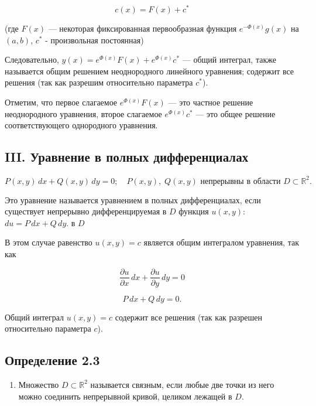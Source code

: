 {\begin{enumerate}
		\[
		c(x) = F(x) + c^*
		\]

		(где $F(x)$ — некоторая фиксированная первообразная функция $e^{-\Phi(x)}g(x)$ на $(a, b)$, $c^*$ - произвольная постоянная)

		Следовательно, \( y(x) = e^{\Phi(x)} F(x) + e^{\Phi(x)} c^* \) — общий интеграл, также называется общим решением неоднородного линейного уравнения; содержит все решения (так как разрешим относительно параметра \( c^* \)).

	Отметим, что первое слагаемое \( e^{\Phi(x)} F(x) \) — это частное решение неоднородного уравнения, второе слагаемое \( e^{\Phi(x)} c^* \) — это общее решение соответствующего однородного уравнения.

	\end{enumerate}

	\subsection*{III. Уравнение в полных дифференциалах}



	\[
	P(x, y)\,dx + Q(x, y)\,dy = 0; \quad P(x, y),\; Q(x, y) \text{ непрерывны в области } D \subset \mathbb{R}^2.
	\]



	Это уравнение называется уравнением в полных дифференциалах, если существует непрерывно дифференцируемая в \( D \) функция \( u(x, y) \): \( du = P\,dx + Q\,dy \). в \( D \)

	В этом случае равенство \( u(x,y) = c \) является общим интегралом уравнения, так как



	\[
	\frac{\partial u}{\partial x}\,dx + \frac{\partial u}{\partial y}\,dy = 0
	\]




	\[
	P\,dx + Q\,dy = 0.
	\]



	Общий интеграл \( u(x, y) = c \) содержит все решения (так как разрешен относительно параметра \( c \)).

	\subsection*{Определение 2.3}

	\begin{enumerate}
	\item Множество \( D \subset \mathbb{R}^2 \) называется связным, если любые две точки из него можно соединить непрерывной кривой, целиком лежащей в \( D \).
	

\end{enumerate}}
